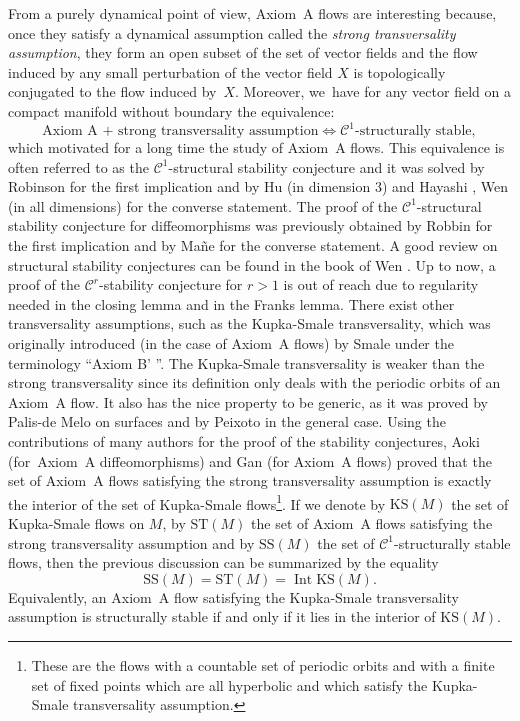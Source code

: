 \documentclass[JEP,XML,SOM,Unicode,NoEqCountersInSection,NoFloatCountersInSection,published]{cedram}
\newcommand{\KS}{\mathrm{KS}}
\newcommand{\rSS}{\mathrm{SS}}
\newcommand{\ST}{\mathrm{ST}}
\theoremstyle{definition}
\theoremstyle{plain}
\newcommand{\Ccal}{\mathcal{C}}
\DeclareMathOperator{\Int}{Int}
\begin{document}
From a purely dynamical point of view, Axiom~A flows are interesting because, once they satisfy a dynamical assumption called the \textit{strong transversality assumption}, they form an open subset of the set of vector fields and the flow induced by any small perturbation of the vector field $X$ is topologically conjugated to the flow induced by~$X$. Moreover, we~have for any vector field on a compact manifold without boundary the equivalence:
\[
\text{Axiom~A + strong transversality assumption} \iff \text{$\Ccal^1$-structurally stable},
\]
which motivated for a long time the study of Axiom~A flows. This equivalence is often referred to as the $\Ccal^1$-structural stability conjecture and it was solved by Robinson \cite{robinson} for the first implication and by Hu \cite{hu} (in dimension $3$) and Hayashi \cite{hayashi}, Wen \cite{wen} (in all dimensions) for the converse statement. The proof of the $\Ccal^1$-structural stability conjecture for diffeomorphisms was previously obtained by Robbin \cite{robbin} for the first implication and by Ma\~{n}e \cite{mane} for the converse statement. A good review on structural stability conjectures can be found in the book of Wen \cite{wen-book}. Up to now, a proof of the $\Ccal^r$-stability conjecture for $r > 1$ is out of reach due to regularity needed in the closing lemma and in the Franks lemma. There exist other transversality assumptions, such as the Kupka-Smale transversality, which was originally introduced (in the case of Axiom~A flows) by Smale under the terminology ``Axiom B' ''. The Kupka-Smale transversality is weaker than the strong transversality since its definition only deals with the periodic orbits of an Axiom~A flow. It also has the nice property to be generic, as it was proved by Palis-de Melo \cite{palis-demelo} on surfaces and by Peixoto \cite{peixoto} in the general case. Using the contributions of many authors for the proof of the stability conjectures, Aoki \cite{aoki} (for~Axiom~A diffeomorphisms) and Gan \cite{gan} (for Axiom~A flows) proved that the set of Axiom~A flows satisfying the strong transversality assumption is exactly the interior of the set of Kupka-Smale flows\footnote{These are the flows with a countable set of periodic orbits and with a finite set of fixed points which are all hyperbolic and which satisfy the Kupka-Smale transversality assumption.}. If we denote by $\KS(M)$ the set of Kupka-Smale flows on $M$, by $\ST(M)$ the set of Axiom~A flows satisfying the strong transversality assumption and by $\rSS(M)$ the set of $\Ccal^1$-structurally stable flows, then the previous discussion can be summarized by the equality
\[
\rSS(M) = \ST(M) = \Int \KS(M).
\]
Equivalently, an Axiom~A flow satisfying the Kupka-Smale transversality assumption is structurally stable if and only if it lies in the interior of $\KS(M)$.
\end{document}

